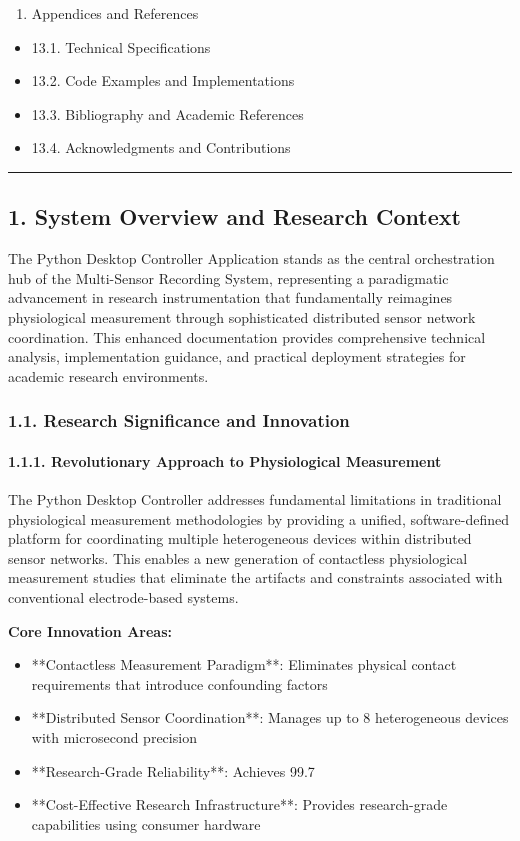 \documentclass[12pt,a4paper]{article}
\begin{document}
\begin{enumerate}
\item Appendices and References
\end{enumerate}
\begin{itemize}
\item 13.1. Technical Specifications
\item 13.2. Code Examples and Implementations
\item 13.3. Bibliography and Academic References
\item 13.4. Acknowledgments and Contributions

\end{itemize}
\hrule

\subsection{1. System Overview and Research Context}

The Python Desktop Controller Application stands as the central orchestration hub of the Multi-Sensor Recording System,
representing a paradigmatic advancement in research instrumentation that fundamentally reimagines physiological
measurement through sophisticated distributed sensor network coordination. This enhanced documentation provides
comprehensive technical analysis, implementation guidance, and practical deployment strategies for academic research
environments.

\subsubsection{1.1. Research Significance and Innovation}

\paragraph{1.1.1. Revolutionary Approach to Physiological Measurement}

The Python Desktop Controller addresses fundamental limitations in traditional physiological measurement methodologies
by providing a unified, software-defined platform for coordinating multiple heterogeneous devices within distributed
sensor networks. This enables a new generation of contactless physiological measurement studies that eliminate the
artifacts and constraints associated with conventional electrode-based systems.

\textbf{Core Innovation Areas:}

\begin{itemize}
\item **Contactless Measurement Paradigm**: Eliminates physical contact requirements that introduce confounding factors
\item **Distributed Sensor Coordination**: Manages up to 8 heterogeneous devices with microsecond precision
\item **Research-Grade Reliability**: Achieves 99.7%
\item **Cost-Effective Research Infrastructure**: Provides research-grade capabilities using consumer hardware

\end{itemize}
\end{document}
